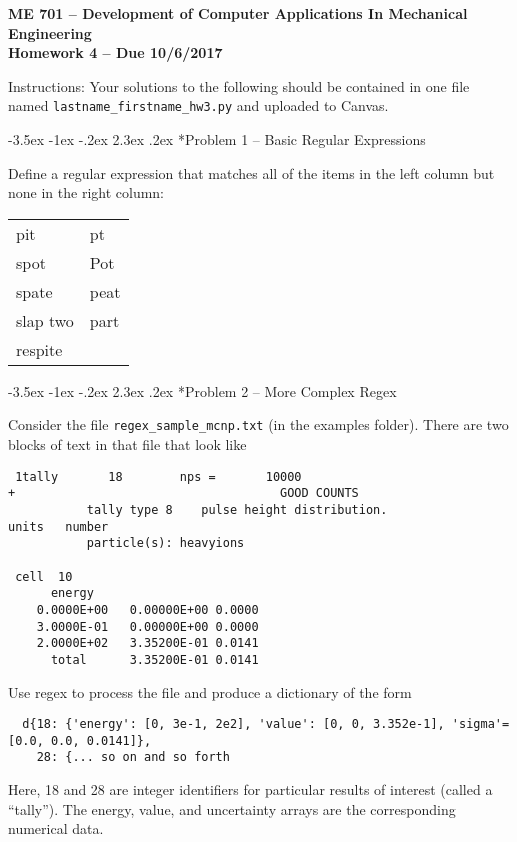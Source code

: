 \documentclass[11pt]{article}
\makeatletter
\renewcommand\section{\@startsection{section}{1}{\z@}%
                                  {-3.5ex \@plus -1ex \@minus -.2ex}%
                                  {2.3ex \@plus.2ex}%
                                  {\normalfont\bfseries}}
\makeatother
\begin{document}
{\large
  \begin{center}
    {\bf ME 701 -- Development of Computer Applications In Mechanical Engineering \\ 
         Homework 4 -- Due 10/6/2017}         
  \end{center}
}
 
Instructions:  Your solutions to the following should be contained in
one file named {\tt lastname\_firstname\_hw3.py} and uploaded to Canvas.


\section*{Problem 1 -- Basic Regular Expressions}

Define a regular expression that matches all of the items 
in the left column but none in the right column:
\begin{tabular}{ll}
 pit  & pt\\
 spot & Pot\\
 spate & peat\\
 slap two & part\\
 respite &
\end{tabular}

\section*{Problem 2 -- More Complex Regex}

Consider the file {\tt regex\_sample\_mcnp.txt} (in the examples folder).  There are two blocks of text in that file that look like
\begin{verbatim}
 1tally       18        nps =       10000
+                                     GOOD COUNTS                                                              
           tally type 8    pulse height distribution.                   units   number         
           particle(s): heavyions
 
 cell  10                                                                                                                              
      energy   
    0.0000E+00   0.00000E+00 0.0000
    3.0000E-01   0.00000E+00 0.0000
    2.0000E+02   3.35200E-01 0.0141
      total      3.35200E-01 0.0141
\end{verbatim}
Use regex to process the file and produce a dictionary of the form 
  \begin{lstlisting}
  d{18: {'energy': [0, 3e-1, 2e2], 'value': [0, 0, 3.352e-1], 'sigma'=[0.0, 0.0, 0.0141]},
    28: {... so on and so forth
  \end{lstlisting}
Here, 18 and 28 are integer identifiers for particular results of interest (called a ``tally'').  The energy, value, and uncertainty arrays are the corresponding numerical data.
\end{document}
